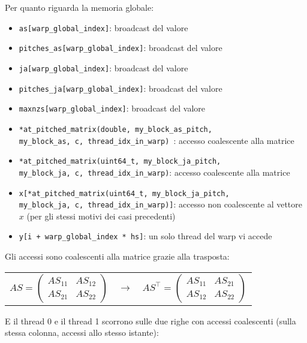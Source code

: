\documentclass[a4paper,9pt]{extarticle}
\begin{document}
Per quanto riguarda la memoria globale:

\begin{itemize}
	\item \texttt{as[warp\_global\_index]}: broadcast del valore
	\item \texttt{pitches\_as[warp\_global\_index]}: broadcast del valore
	\item \texttt{ja[warp\_global\_index]}: broadcast del valore
	\item \texttt{pitches\_ja[warp\_global\_index]}: broadcast del valore
	\item \texttt{maxnzs[warp\_global\_index]}: broadcast del valore
	\item \texttt{*at\_pitched\_matrix(double, my\_block\_as\_pitch, \\ my\_block\_as, c, thread\_idx\_in\_warp) }: accesso
	coalescente alla matrice
	\item \texttt{*at\_pitched\_matrix(uint64\_t, my\_block\_ja\_pitch, \\ my\_block\_ja, c, thread\_idx\_in\_warp)}: accesso
	coalescente alla matrice
	\item \texttt{x[*at\_pitched\_matrix(uint64\_t, my\_block\_ja\_pitch, \\ my\_block\_ja, c, thread\_idx\_in\_warp)]}:
	accesso non coalescente al vettore $x$ (per gli stessi motivi dei casi precedenti)
	\item \texttt{y[i + warp\_global\_index * hs]}: un solo thread del warp vi accede
\end{itemize}

Gli accessi sono coalescenti alla matrice grazie alla trasposta:

\begin{minipage}{\linewidth}
\centering
\begin{tabular}{c c c} 
$
AS =
\begin{pmatrix}
AS_{11} & AS_{12} \\
AS_{21} & AS_{22}
\end{pmatrix}
$ &
$\rightarrow$ &
$
AS^{\top} =
\begin{pmatrix}
AS_{11} & AS_{21} \\
AS_{12} & AS_{22}
\end{pmatrix}
$ \\
\end{tabular}
\end{minipage}

E il thread 0 e il thread 1 scorrono sulle due righe con accessi coalescenti (sulla stessa colonna, accessi allo stesso
istante):
\end{document}
